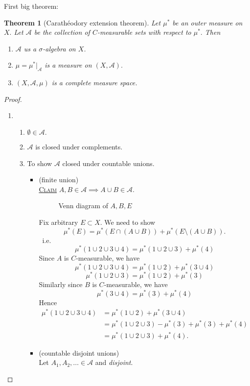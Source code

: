 \documentclass{report}
\newcommand{\ie}{\ i.e.\ }
\newcommand{\fancyem}[1]{\underline{\textsc{#1}}}
\newtheorem{theorem}{Theorem}[chapter]
\theoremstyle{definition}
\theoremstyle{remark}
\begin{document}
First big theorem:
\begin{theorem}[Carathéodory extension theorem]
Let $\mu^*$ be an outer measure on $X.$ Let $\mathcal{A}$ be the collection of $C$-measurable sets with respect to $\mu^*.$ Then
\begin{enumerate}
\item
	$\mathcal{A}$ us a $\sigma$-algebra on $X$.
\item
	$\mu = \mu^*|_{\mathcal{A}}$ is a measure on $(X, \mathcal{A}).$
\item
	$(X, \mathcal{A}, \mu)$ is a complete measure space.
\end{enumerate}
\end{theorem}
\begin{proof}
\begin{enumerate}
\item
	\begin{enumerate}
	\item
		$\emptyset \in \mathcal{A}.$
	\item
		$\mathcal{A}$ is closed under complements.
	\item
		To show $\mathcal{A}$ closed under countable unions.
		\begin{itemize}
		\item(finite union)\\
		\fancyem{Claim} $A, B \in \mathcal{A} \implies A \cup B \in \mathcal{A}.$
		
		\begin{figure}[h]
		\centering
		\label{fig:AB}
		\caption{Venn diagram of $A, B, E$}
		\end{figure}
		
		Fix arbitrary $E \subset X$. We need to show 
		\[
			\mu^*(E) = \mu^*(E \cap (A \cup B)) + \mu^*(E \setminus (A \cup B)).		
		\]
		\ie
		\[
			\mu^*(1 \cup 2 \cup 3 \cup 4) = \mu^*(1 \cup 2 \cup 3) + \mu^*(4)
		\]
		Since $A$ is $C$-measurable, we have
		\[
			\mu^*(1 \cup 2 \cup 3 \cup 4) = \mu^*(1 \cup 2) + \mu^*(3 \cup 4)
		\]
		\[
			\mu^*(1 \cup 2 \cup 3) = \mu^*(1 \cup 2) + \mu^*(3)
		\]
		Similarly since $B$ is $C$-measurable, we have
		\[
			\mu^*(3 \cup 4) = \mu^*(3) + \mu^*(4)
		\]
		Hence
		\begin{align*}
		\mu^*(1 \cup 2 \cup 3 \cup 4)
		& = \mu^*(1 \cup 2) + \mu^*(3 \cup 4) \\
		& = \mu^*(1 \cup 2 \cup 3) - \mu^*(3) + \mu^*(3) + \mu^*(4) \\
		& = \mu^*(1 \cup 2 \cup 3) + \mu^*(4).
		\end{align*}
		\item(countable disjoint unions)\\
		Let $A_1, A_2, \ldots \in \mathcal{A}$ and \emph{disjoint}.
		

\end{itemize}
\end{enumerate}
\end{enumerate}
\end{proof}
\end{document}
